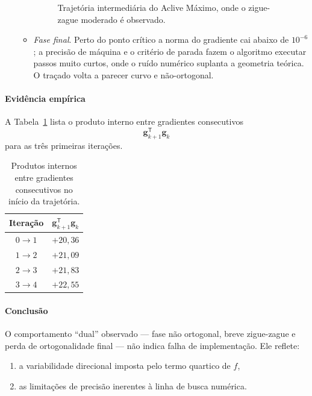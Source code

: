 \documentclass[12pt]{article}
\begin{document}
\begin{enumerate}
\begin{itemize}
\begin{figure}[H]
                \caption{Trajetória intermediária do Aclive Máximo, onde o zigue-zague moderado é observado.}
                \end{figure}
          \item \emph{Fase final}.  Perto do ponto crítico a norma do gradiente cai abaixo de $10^{-6}$; a precisão de máquina e o critério de parada fazem o algoritmo executar passos muito curtos, onde o ruído numérico suplanta a geometria teórica.  O traçado volta a parecer curvo e não-ortogonal.
        \end{itemize}
\end{enumerate}

\paragraph{Evidência empírica}

A Tabela~\ref{tab:produtos} lista o produto interno entre gradientes consecutivos
\[
\mathbf{g}_{k+1}^{\mathsf T}\mathbf{g}_{k}
\]
para as três primeiras iterações.

\begin{table}[H]
\centering
\caption{Produtos internos entre gradientes consecutivos no início da trajetória.}
\label{tab:produtos}
\begin{tabular}{cc}
\toprule
Iteração & $\mathbf{g}_{k+1}^{\mathsf T}\mathbf{g}_{k}$ \\
\midrule
$0\!\to\!1$ & $+20{,}36$ \\
$1\!\to\!2$ & $+21{,}09$ \\
$2\!\to\!3$ & $+21{,}83$ \\
$3\!\to\!4$ & $+22{,}55$ \\
\bottomrule
\end{tabular}
\end{table}


\paragraph{Conclusão}

O comportamento ``dual'' observado — fase não ortogonal, breve zigue-zague e perda de ortogonalidade final — não indica falha de implementação.  
Ele reflete:

\begin{enumerate}
  \item a variabilidade direcional imposta pelo termo quartico de $f$,
  \item as limitações de precisão inerentes à linha de busca numérica.
\end{enumerate}
\end{document}
